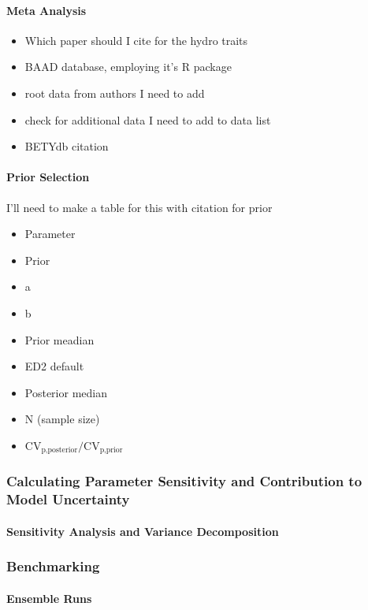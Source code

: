 \documentclass[10pt]{article}
\begin{document}
\paragraph{Meta Analysis}

\begin{itemize}
    \item Which paper should I cite for the hydro traits
    \item BAAD database, employing it's R package
    \item root data from authors I need to add
    \item check for additional data I need to add to data list
    \item BETYdb citation
\end{itemize}

\paragraph{Prior Selection}

I'll need to make a table for this with citation for prior

\begin{itemize}
    \item Parameter
    \item Prior
    \item a
    \item b
    \item Prior meadian
    \item ED2 default
    \item Posterior median
    \item N (sample size)
    \item $\text{CV}_{\text{p,posterior}}/\text{CV}_{\text{p,prior}}$
\end{itemize}

\subsubsection*{Calculating Parameter Sensitivity and Contribution to Model Uncertainty}

\paragraph{Sensitivity Analysis and Variance Decomposition}

\subsubsection*{Benchmarking}

\paragraph{Ensemble Runs}

\newpage




\end{document}
